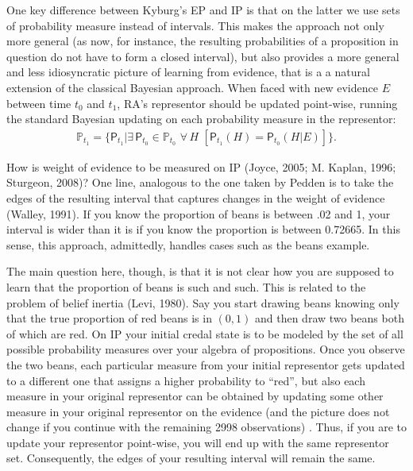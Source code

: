 \documentclass[
  10pt,
  dvipsnames,enabledeprecatedfontcommands]{scrartcl}
\begin{document}
One key difference between Kyburg's \textsf{EP} and \textsf{IP} is that
on the latter we use sets of probability measure instead of intervals.
This makes the approach not only more general (as now, for instance, the
resulting probabilities of a proposition in question do not have to form
a closed interval), but also provides a more general and less
idiosyncratic picture of learning from evidence, that is a a natural
extension of the classical Bayesian approach. When faced with new
evidence \(E\) between time \(t_0\) and \(t_1\), RA's representor should
be updated point-wise, running the standard Bayesian updating on each
probability measure in the representor:
\begin{align*} \label{eq:updateRepresentor}
\mathbb{P}_{t_1} = \{\mathsf{P}_{t_1}\vert \exists\, {\mathsf{P}_{t_0} \!\in  \mathbb{P}_{t_0}}\,\, \forall\, {H}\,\, \left[\mathsf{P}_{t_1}(H)=\mathsf{P}_{t_0}(H \vert E)\right] \}.
\end{align*}

How is weight of evidence to be measured on \textsf{IP} (Joyce, 2005; M.
Kaplan, 1996; Sturgeon, 2008)? One line, analogous to the one taken by
Pedden is to take the edges of the resulting interval that captures
changes in the weight of evidence (Walley, 1991). If you know the
proportion of beans is between .02 and 1, your interval is wider than it
is if you know the proportion is between 0.72665. In this sense, this
approach, admittedly, handles cases such as the beans example.

The main question here, though, is that it is not clear how you are
supposed to learn that the proportion of beans is such and such. This is
related to the problem of belief inertia (Levi, 1980). Say you start
drawing beans knowing only that the true proportion of red beans is in
\((0,1)\) and then draw two beans both of which are red. On \textsf{IP}
your initial credal state is to be modeled by the set of all possible
probability measures over your algebra of propositions. Once you observe
the two beans, each particular measure from your initial representor
gets updated to a different one that assigns a higher probability to
``red'', but also each measure in your original representor can be
obtained by updating some other measure in your original representor on
the evidence (and the picture does not change if you continue with the
remaining 2998 observations) . Thus, if you are to update your
representor point-wise, you will end up with the same representor set.
Consequently, the edges of your resulting interval will remain the same.
\end{document}
